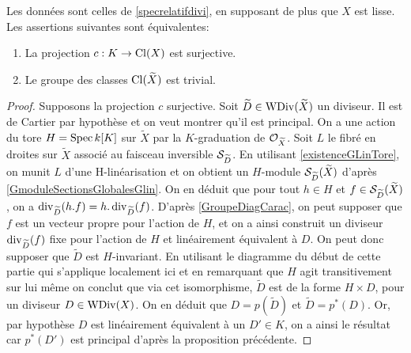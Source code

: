 \begin{thm}\label{clgtrivial}
Les données sont celles de \ref{specrelatifdivi}, en supposant de plus que $X$ est lisse. Les assertions suivantes sont équivalentes:
\begin{enumerate}
\item La projection $c:K\rightarrow \operatorname{Cl}(X)$ est surjective.
\item Le groupe des classes $\operatorname{Cl}(\widetilde{X})$ est trivial.
\end{enumerate}
\end{thm}
\begin{proof}
Supposons la projection $c$ surjective. Soit $\widetilde{D}\in \operatorname{WDiv}(\widetilde{X})$ un diviseur. Il est de Cartier par hypothèse et on veut montrer qu'il est principal. On a une action du tore $H=\operatorname{Spec} k[K]$ sur $\widetilde{X}$ par la $K$-graduation de $\mathcal{O}_{\widetilde{X}}$. Soit $L$ le fibré en droites sur $\widetilde{X}$ associé au faisceau inversible $\mathcal{S}_{\widetilde{D}}$. En utilisant \ref{existenceGLinTore}, on munit $L$ d'une H-linéarisation et on obtient un $H$-module $\mathcal{S}_{\widetilde{D}}(\widetilde{X})$ d'après \ref{GmoduleSectionsGlobalesGlin}. On en déduit que pour tout $h\in H$ et $f\in \mathcal{S}_{\widetilde{D}}(\widetilde{X})$, on a $\operatorname{div}_{\widetilde{D}}(h.f)=h.\operatorname{div}_{\widetilde{D}}(f)$. D'après \ref{GroupeDiagCarac}, on peut supposer que $f$ est un vecteur propre pour l'action de $H$, et on a ainsi construit un diviseur $\operatorname{div}_{\widetilde{D}}(f)$ fixe pour l'action de $H$ et linéairement équivalent à $D$. On peut donc supposer que $\widetilde{D}$ est $H$-invariant. En utilisant le diagramme du début de cette partie qui s'applique localement ici et en remarquant que $H$ agit transitivement sur lui même on conclut que via cet isomorphisme, $\widetilde{D}$ est de la forme $H\times D$, pour un diviseur $D\in \operatorname{WDiv}(X)$. On en déduit que $D=p(\widetilde{D})$ et $\widetilde{D}=p^*(D)$. Or, par hypothèse $D$ est linéairement équivalent à un $D'\in K$, on a ainsi le résultat car $p^*(D')$ est principal d'après la proposition précédente.


\end{proof}
